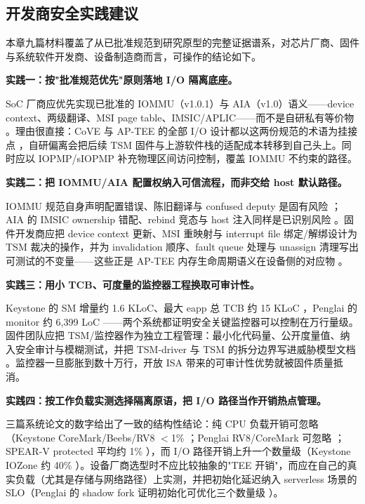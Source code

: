 \documentclass[11pt]{ctexart}
\begin{document}
\subsection{开发商安全实践建议}
本章九篇材料覆盖了从已批准规范到研究原型的完整证据谱系，对芯片厂商、固件与系统软件开发商、设备制造商而言，可操作的结论如下。\par
\noindent\textbf{实践一：按"批准规范优先"原则落地 I/O 隔离底座。}\par
SoC 厂商应优先实现已批准的 IOMMU（v1.0.1）与 AIA（v1.0）语义——device context、两级翻译、MSI page table、IMSIC/APLIC——而不是自研私有等价物 \cite{riscv_iommu_2023,riscv_aia_2023}。理由很直接：CoVE 与 AP-TEE 的全部 I/O 设计都以这两份规范的术语为挂接点 \cite{sahita2023cove,riscv_ap_tee_2024}，自研偏离会把后续 TSM 固件与上游软件栈的适配成本转移到自己头上。同时应以 IOPMP/sIOPMP 补充物理区间访问控制，覆盖 IOMMU 不约束的路径。\par
\noindent\textbf{实践二：把 IOMMU/AIA 配置权纳入可信流程，而非交给 host 默认路径。}\par
IOMMU 规范自身声明配置错误、陈旧翻译与 confused deputy 是固有风险 \cite{riscv_iommu_2023}；AIA 的 IMSIC ownership 错配、rebind 竞态与 host 注入同样是已识别风险 \cite{riscv_aia_2023}。固件开发商应把 device context 更新、MSI 重映射与 interrupt file 绑定/解绑设计为 TSM 裁决的操作，并为 invalidation 顺序、fault queue 处理与 unassign 清理写出可测试的不变量——这些正是 AP-TEE 内存生命周期语义在设备侧的对应物 \cite{riscv_ap_tee_2024}。\par
\noindent\textbf{实践三：用小 TCB、可度量的监控器工程换取可审计性。}\par
Keystone 的 SM 增量约 1.6 KLoC、最大 eapp 总 TCB 约 15 KLoC \cite{lee2020keystone}，Penglai 的 monitor 约 6,399 LoC \cite{feng2021penglai}——两个系统都证明安全关键监控器可以控制在万行量级。固件团队应把 TSM/监控器作为独立工程管理：最小化代码量、公开度量值、纳入安全审计与模糊测试，并把 TSM-driver 与 TSM 的拆分边界写进威胁模型文档 \cite{sahita2023cove}。监控器一旦膨胀到数十万行，开放 ISA 带来的可审计性优势就被固件质量抵消。\par
\noindent\textbf{实践四：按工作负载实测选择隔离原语，把 I/O 路径当作开销热点管理。}\par
三篇系统论文的数字给出了一致的结构性结论：纯 CPU 负载开销可忽略（Keystone CoreMark/Beebs/RV8 $<$1\% \cite{lee2020keystone}；Penglai RV8/CoreMark 可忽略 \cite{feng2021penglai}；SPEAR-V protected 平均约 1\% \cite{schrammel2023spearv}），而 I/O 路径开销上升一个数量级（Keystone IOZone 约 40\% \cite{lee2020keystone}）。设备厂商选型时不应比较抽象的"TEE 开销"，而应在自己的真实负载（尤其是存储与网络路径）上实测，并把初始化延迟纳入 serverless 场景的 SLO（Penglai 的 shadow fork 证明初始化可优化三个数量级 \cite{feng2021penglai}）。\par
\end{document}
